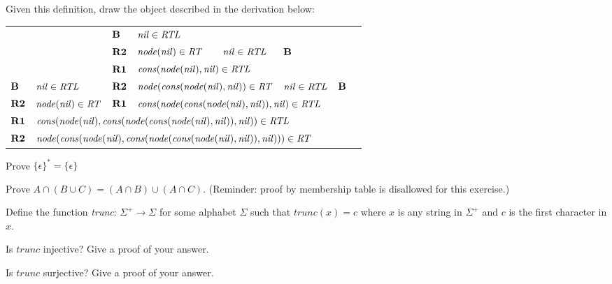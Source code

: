 \documentclass[addpoints]{exam}
\begin{document}
\begin{questions}
Given this definition, draw the object described in the derivation below: 

\begin{tabular}{llllllll}
           &                                 & $\mbox{\bf B}$             & $\mbox{\it nil\/}\in\mbox{\it RTL\/}$ & & & &\\ 
\cline{4-4}
           &                                 & $\mbox{\bf R2}$            & $\mbox{\it node\/}(\mbox{\it nil\/})\in\mbox{\it RT\/}$ & $\mbox{\it nil\/}\in\mbox{\it RTL\/}$ & $\mbox{\bf B}$ & & \\ 
\cline{4-5}
           &                                 & $\mbox{\bf R1}$            & \multicolumn{2}{l}{$\mbox{\it cons\/}(\mbox{\it node\/}(\mbox{\it nil\/}),\mbox{\it nil\/})\in\mbox{\it RTL\/}$}  & & &\\
\cline{4-5}
$\mbox{\bf B}$  & $\mbox{\it nil\/}\in\mbox{\it RTL\/}$           & $\mbox{\bf R2}$            & \multicolumn{2}{l}{$\mbox{\it node\/}(\mbox{\it cons\/}(\mbox{\it node\/}(\mbox{\it nil\/}),\mbox{\it nil\/}))\in\mbox{\it RT\/}$} & $\mbox{\it nil\/}\in\mbox{\it RTL\/}$ & $\mbox{\bf B}$ &\\ 
\cline{2-2} \cline{4-6}
$\mbox{\bf R2}$ & $\mbox{\it node\/}(\mbox{\it nil\/})\in\mbox{\it RT\/}$ & $\mbox{\bf R1}$            & \multicolumn{3}{l}{$\mbox{\it cons\/}(\mbox{\it node\/}(\mbox{\it cons\/}(\mbox{\it node\/}(\mbox{\it nil\/}),\mbox{\it nil\/})), \mbox{\it nil\/})\in\mbox{\it RTL\/}$} & & \\
\cline{2-6}
$\mbox{\bf R1}$ &
\multicolumn{5}{l}{$\mbox{\it cons\/}(\mbox{\it node\/}(\mbox{\it nil\/}),\mbox{\it cons\/}(\mbox{\it node\/}(\mbox{\it cons\/}(\mbox{\it node\/}(\mbox{\it nil\/}),\mbox{\it nil\/})),\mbox{\it nil\/})) \in \mbox{\it RTL\/}$} & &\\
\cline{2-6}
$\mbox{\bf R2}$ & \multicolumn{5}{l}{$\mbox{\it node\/}(\mbox{\it cons\/}(\mbox{\it node\/}(\mbox{\it nil\/}),\mbox{\it cons\/}(\mbox{\it node\/}(\mbox{\it cons\/}(\mbox{\it node\/}(\mbox{\it nil\/}),\mbox{\it nil\/})),\mbox{\it nil\/})))\in\mbox{\it RT\/}$} & &
\end{tabular}

\vspace{50cm}

\question[2]
Prove $\{\epsilon\}^* = \{\epsilon\}$

\vspace{20mm}


\question[3]
Prove $A \cap (B \cup C) = (A \cap B) \cup (A \cap C)$. (Reminder: proof by
membership table is disallowed for this exercise.)


\vspace{30mm}

\question[4]
Define the function \emph{trunc}: $\Sigma^+ \to \Sigma$ for some
alphabet $\Sigma$ such that $trunc(x) = c$
where $x$ is any string in $\Sigma^+$ and $c$ is the first character in $x$.

Is $trunc$ injective? Give a proof of your answer. 
\vspace{18mm}

Is $trunc$ surjective? Give a proof of your answer.
\vspace{18mm}


\end{questions}
\end{document}
